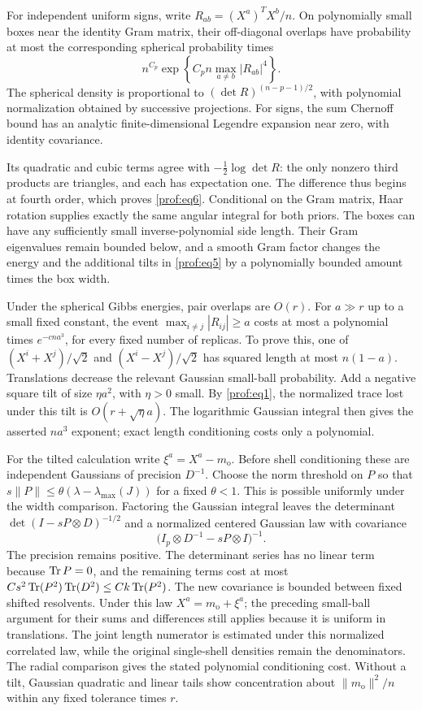 For independent uniform signs, write
$R_{ab}=(X^a)^TX^b/n$.  On polynomially small boxes near the identity
Gram matrix, their off-diagonal overlaps have probability at most
the corresponding spherical probability times
\begin{equation}\label{prof:eq6}
 n^{C_p}\exp\!\left\{C_pn\max_{a\ne b}|R_{ab}|^4\right\}.
\end{equation}
The spherical density is proportional to
$(\det R)^{(n-p-1)/2}$, with polynomial normalization obtained by
successive projections.  For signs, the sum Chernoff bound has an
analytic finite-dimensional Legendre expansion near zero, with
identity covariance.

Its quadratic and cubic terms agree with
$-\tfrac12\log\det R$: the only nonzero third products are triangles,
and each has expectation one.  The difference thus begins at fourth
order, which proves \eqref{prof:eq6}.  Conditional on the Gram matrix,
Haar rotation supplies exactly the same angular integral for both
priors.  The boxes can have any sufficiently small inverse-polynomial
side length.  Their Gram eigenvalues remain bounded below, and a
smooth Gram factor changes the energy and the additional tilts in
\eqref{prof:eq5} by a polynomially bounded amount times the box width.

Under the spherical Gibbs energies, pair overlaps are $O(r)$.
For $a\gg r$ up to a small fixed constant, the event
$\max_{i\ne j}|R_{ij}|\ge a$ costs at most a polynomial times
$e^{-cna^3}$, for every fixed number of replicas.  To prove this,
one of $(X^i+X^j)/\sqrt2$ and $(X^i-X^j)/\sqrt2$ has squared length
at most $n(1-a)$.  Translations decrease the relevant Gaussian
small-ball probability.  Add a negative square tilt of size
$\eta a^2$, with $\eta>0$ small.  By \eqref{prof:eq1}, the normalized
trace lost under this tilt is $O(r+\sqrt\eta a)$.  The logarithmic
Gaussian integral then gives the asserted $na^3$ exponent; exact
length conditioning costs only a polynomial.

For the tilted calculation write $\xi^a=X^a-m_{\mathrm o}$.
Before shell conditioning these are independent Gaussians of
precision $D^{-1}$. Choose the norm threshold on $P$ so that
$s\|P\|\le\theta(\lambda-\lambda_{\max}(J))$ for a fixed $\theta<1$.
This is possible uniformly under the width comparison. Factoring the
Gaussian integral leaves the determinant
$\det(I-sP\otimes D)^{-1/2}$ and a normalized centered Gaussian law
with covariance
\[
 \bigl(I_p\otimes D^{-1}-sP\otimes I\bigr)^{-1}.
\]
The precision remains positive. The determinant series has no linear
term because $\operatorname{Tr} P=0$, and the remaining terms cost at most
$Cs^2\operatorname{Tr}(P^2)\operatorname{Tr}(D^2)\le Ck\operatorname{Tr}(P^2)$.
The new covariance is bounded between fixed shifted resolvents.
Under this law $X^a=m_{\mathrm o}+\xi^a$; the preceding small-ball
argument for their sums and differences still applies because it is
uniform in translations. The joint length numerator is estimated
under this normalized correlated law, while the original single-shell
densities remain the denominators. The radial comparison gives the
stated polynomial conditioning cost. Without a tilt, Gaussian
quadratic and linear tails show concentration about
$\|m_{\mathrm o}\|^2/n$ within any fixed tolerance times $r$.

